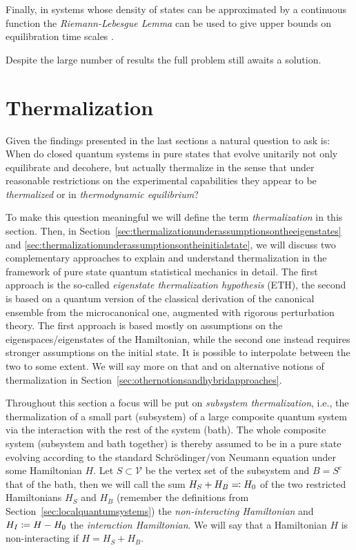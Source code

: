 \documentclass[a4paper,12pt,listof=totoc,index=totoc,bibliography=totoc,headsepline=false,headings=normal,BCOR16.153846mm,DIV12,headinclude,twoside,cleardoublepage=empty,numbers=noenddot,final]{scrreprt}
\theoremstyle{mystyle}
\numberwithin{equation}{section}
\numberwithin{figure}{section}
\numberwithin{lemma}{section}
\numberwithin{theorem}{section}
\numberwithin{corollary}{section}
\numberwithin{definition}{section}
\numberwithin{conjecture}{section}
\numberwithin{observation}{section}
\newcommand{\+}{\mkern2mu}
\newcommand{\coloneqq}{\mathrel{\vcentcolon\mkern-1.2mu=}} %
\newcommand{\eqqcolon}{\mathrel{=\mkern-1.2mu\vcentcolon}}
\renewcommand{\H}{H}
\newcommand{\Vset}{\mathcal{V}}
\newcommand{\ket}[1]{|#1\rangle}
\newcommand{\compl}[1]{{{#1}^c}}
\DeclareMathOperator{\1}{\mathds{1}}
\begin{document}
Finally, in systems whose density of states can be approximated by a continuous function the \emph{Riemann-Lebesgue Lemma} \cite{Bochner49} can be used to give upper bounds on equilibration time scales \cite{Yukalov2011}.

Despite the large number of results the full problem still awaits a solution.


\section{Thermalization}
\label{sec:thermalization}
%
Given the findings presented in the last sections a natural question to ask is:
When do closed quantum systems in pure states that evolve unitarily not only equilibrate and decohere, but actually thermalize in the sense that under reasonable restrictions on the experimental capabilities they appear to be \emph{thermalized} or in \emph{thermodynamic equilibrium}?

To make this question meaningful we will define the term \emph{thermalization} in this section.
Then, in Section~\ref{sec:thermalizationunderassumptionsontheeigenstates} and \ref{sec:thermalizationunderassumptionsontheinitialstate}, we will discuss two complementary approaches to explain and understand thermalization in the framework of pure state quantum statistical mechanics in detail.
The first approach is the so-called \emph{eigenstate thermalization hypothesis} (ETH), the second is based on a quantum version of the classical derivation of the canonical ensemble from the microcanonical one, augmented with rigorous perturbation theory.
The first approach is based mostly on assumptions on the eigenspaces/eigenstates of the Hamiltonian, while the second one instead requires stronger assumptions on the initial state.
It is possible to interpolate between the two to some extent.
We will say more on that and on alternative notions of thermalization in Section~\ref{sec:othernotionsandhybridapproaches}.

Throughout this section a focus will be put on \emph{subsystem thermalization}, i.e., the thermalization of a small part (subsystem) of a large composite quantum system via the interaction with the rest of the system (bath).
The whole composite system (subsystem and bath together) is thereby assumed to be in a pure state evolving according to the standard Schrödinger/von Neumann equation under some Hamiltonian $\H$.
Let $S \subset \Vset$ be the vertex set of the subsystem and $B = \compl{S}$ that of the bath, then we will call the sum $\H_S + \H_B \eqqcolon \H_0$ of the two restricted Hamiltonians $\H_S$ and $\H_B$ (remember the definitions from Section~\ref{sec:localquantumsystems}) the \emph{non-interacting Hamiltonian} and $\H_I \coloneqq \H - \H_0$ the \emph{interaction Hamiltonian}.
We will say that a Hamiltonian $\H$ is non-interacting if $\H = \H_S + \H_B$.
\end{document}

